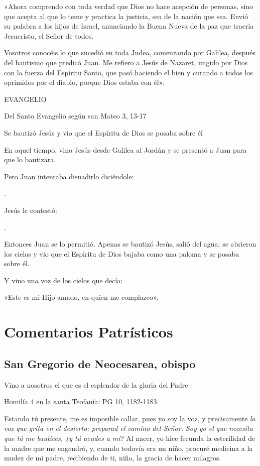 \begin{body}
\begin{body}
{«Ahora comprendo con toda verdad que Dios no hace acepción de personas,
sino que acepta al que lo teme y practica la justicia, sea de la nación
que sea. Envió su palabra a los hijos de Israel, anunciando la Buena
Nueva de la paz que traería Jesucristo, el Señor de todos.

Vosotros conocéis lo que sucedió en toda Judea, comenzando por Galilea,
después del bautismo que predicó Juan. Me refiero a Jesús de Nazaret,
ungido por Dios con la fuerza del Espíritu Santo, que pasó haciendo el
bien y curando a todos los oprimidos por el diablo, porque Dios estaba
con él».

EVANGELIO

Del Santo Evangelio según san Mateo 3, 13-17

Se bautizó Jesús y vio que el Espíritu de Dios se posaba sobre él

En aquel tiempo, vino Jesús desde Galilea al Jordán y se presentó a Juan
para que lo bautizara.

Pero Juan intentaba disuadirlo diciéndole:

.

Jesús le contestó:

.

Entonces Juan se lo permitió. Apenas se bautizó Jesús, salió del agua;
se abrieron los cielos y vio que el Espíritu de Dios bajaba como una
paloma y se posaba sobre él.

Y vino una voz de los cielos que decía:

«Este es mi Hijo amado, en quien me
complazco».

\section{Comentarios Patrísticos}

\subsection{San Gregorio de Neocesarea, obispo}

Vino a nosotros el que es el esplendor de la gloria del Padre

Homilía 4 en la santa Teofanía: PG 10, 1182-1183.

Estando tú presente, me es imposible callar, pues yo soy la voz, y precisamente \emph{la voz que grita en el desierto: preparad el camino del Señor. Soy yo el que necesita que tú me bautices, ¿y tú acudes a mí?} Al nacer, yo hice fecunda la esterilidad de la madre que me engendró, y, cuando todavía era un niño, procuré medicina a la mudez de mi padre, recibiendo de ti, niño, la gracia de hacer milagros.

}
\end{body}
\end{body}
